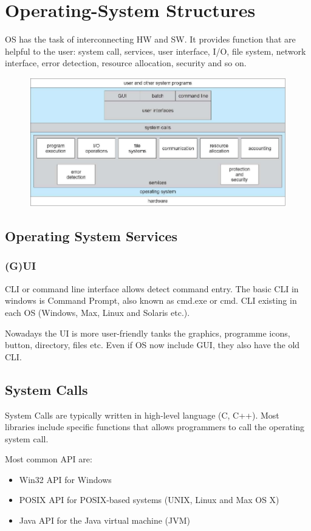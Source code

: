 \chapter{Operating-System Structures}

OS has the task of interconnecting HW and SW. It provides function that are helpful to the user: system call, services, user interface, I/O, file system, network interface, error detection, resource allocation, security and so on.

\begin{figure}[htbp]
    \centering
    \includegraphics[width=0.7\linewidth]{img/SO.png}
\end{figure}

\section{Operating System Services }

\subsection{(G)UI}

CLI or command line interface allows detect command entry. The basic CLI in windows is Command Prompt, also known as cmd.exe or cmd. CLI existing in each OS (Windows, Max, Linux and Solaris etc.).

Nowadays the UI is more user-friendly tanks the graphics, programme icons, button, directory, files etc. Even if  OS now include GUI, they also have the old CLI.


\newpage
\section{System Calls}
System Calls are typically written in high-level language (C, C++). Most libraries include specific functions that allows programmers to call the operating system call. 

Most common API are:
\begin{itemize}
    \item Win32 API for Windows
    \item POSIX API for POSIX-based systems (UNIX, Linux and Max OS X)
    \item Java API for the Java virtual machine (JVM)
\end{itemize}


